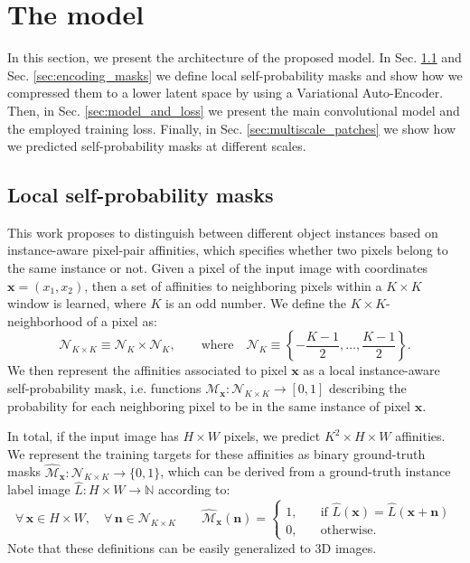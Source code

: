 
\section{The model}\label{sec:model}

In this section, we present the architecture of the proposed model. In Sec. \ref{sec:self_masks} and Sec. \ref{sec:encoding_masks} we define local self-probability masks and show how we compressed them to a lower latent space by using a Variational Auto-Encoder. Then, in Sec. \ref{sec:model_and_loss} we present the main convolutional model and the employed training loss. Finally, in Sec. \ref{sec:multiscale_patches} we show how we predicted self-probability masks at different scales.

\subsection{Local self-probability masks}\label{sec:self_masks}
This work proposes to distinguish between different object instances based on instance-aware pixel-pair affinities, which specifies whether two pixels belong to the same instance or not.
Given a pixel of the input image with coordinates $\mathbf{x}= (x_1, x_2)$, then a set of affinities to neighboring pixels within a $K\times K$ window is learned, where $K$ is an odd number. 
We define the $K\times K$-neighborhood of a pixel as:
\begin{equation}
\mathcal{N}_{K\times K} \equiv \mathcal{N}_{K} \times \mathcal{N}_{K}, \qquad \text{where} \quad \mathcal{N}_{K} \equiv \left\{-\frac{K-1}{2}, \ldots, \frac{K-1}{2}\right\}.
\end{equation}
 We then represent the affinities associated to pixel $\mathbf{x}$ as a local instance-aware self-probability mask, i.e. functions $\mathcal{M}_{\mathbf{x}}: \mathcal{N}_{K\times K} \rightarrow [0,1]$ describing the probability for each neighboring pixel to be in the same instance of pixel $\mathbf{x}$.

In total, if the input image has $H\times W$ pixels, we predict $K^2 \times H \times W$ affinities. We represent the training targets for these affinities as binary ground-truth masks $\hat{\mathcal{M}}_{\mathbf{x}}: \mathcal{N}_{K\times K} \rightarrow \{0,1\}$, which can be derived from a ground-truth instance label image $\hat{L}: H\times W \rightarrow \mathbb{N}$ according to:
\begin{equation}
\forall\, \mathbf{x}\in H\times W, \quad \forall\, \mathbf{n}\in \mathcal{N}_{K\times K} \qquad \hat{\mathcal{M}}_{\mathbf{x}}(\mathbf{n}) = 
\begin{cases}
1, \quad &\text{if } \hat{L}(\mathbf{x}) = \hat{L}(\mathbf{x}+\mathbf{n}) \\
0, \quad & \text{otherwise}. 
\end{cases}
\end{equation}
Note that these definitions can be easily generalized to 3D images.

